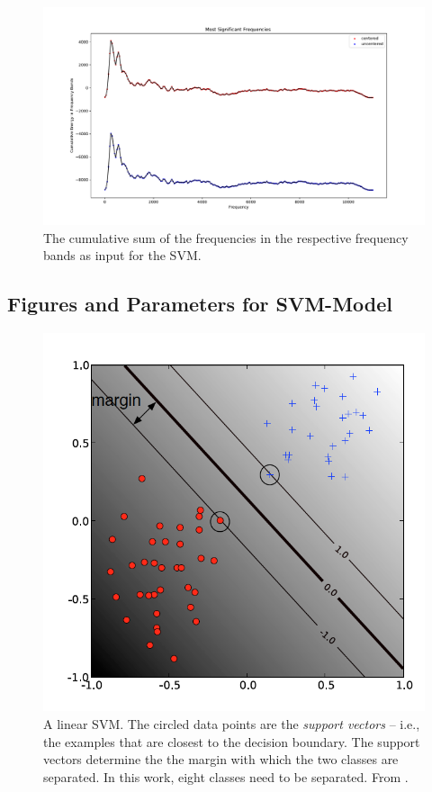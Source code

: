 \documentclass[11pt,a4paper,twoside]{article}
\theoremstyle{thmbreak}
\numberwithin{Theorem}{subsection}
\theoremstyle{defbreak}
\theoremstyle{remark}
\theoremstyle{remark}
\begin{document}
\newpage

\begin{figure}[htp!]
	\centering
	\includegraphics[scale=.5]{frequency_histogram.pdf}
	\caption{The cumulative sum of the frequencies in the respective  frequency bands as input for the SVM. }
	\label{fig:4.1 histogram}
\end{figure}




\subsection{Figures and Parameters for SVM-Model}

\begin{figure}[ht!]
	\centering
	\includegraphics[scale=0.7]{svm.png}
	\caption{A linear SVM. The circled data points are the \textit{support vectors} -- i.e., the examples that are closest to the decision boundary. The support vectors determine the the margin with which the two classes are separated. In this work, eight classes need to be separated. From \cite{ben2010user}.}
	\label{fig:2.4 svm}
\end{figure}
\end{document}
